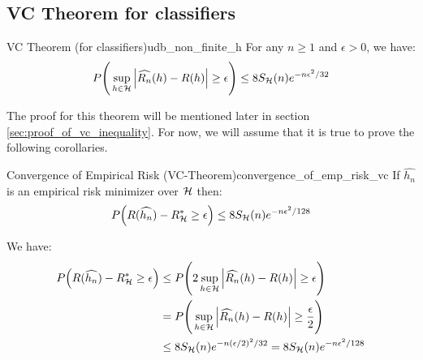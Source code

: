 \subsection{VC Theorem for classifiers}
\begin{theorem}{VC Theorem (for classifiers)}{udb_non_finite_h}
    For any $n\ge1$ and $\epsilon>0$, we have:
    \begin{align*}
        P\Bigg( 
            \sup_{h\in\mathcal{H}} \Big| 
                \widehat{R_n}(h) - R(h)
             \Big| \ge \epsilon
         \Bigg) \le 8S_{\mathcal{H}}(n) e^{-n\epsilon^2/32}
    \end{align*}
\end{theorem}

\begin{proof*}
    The proof for this theorem will be mentioned later in section \ref{sec:proof_of_vc_inequality}. For now, we will assume that it is true to prove the following corollaries.
\end{proof*}

\begin{corollary}{Convergence of Empirical Risk (VC-Theorem)}{convergence_of_emp_risk_vc}
    If $\widehat{h_n}$ is an empirical risk minimizer over $\mathcal{H}$ then:
    \begin{align*}
        P\Big( 
            R(\widehat{h_n}) - R_{\mathcal{H}}^* \ge \epsilon
         \Big) \le 8S_{\mathcal{H}}(n)e^{-n\epsilon^2/128}
    \end{align*}
\end{corollary}

\begin{proof*}
    We have:
    \begin{align*}
        P\Big( 
            R(\widehat{h_n}) - R_{\mathcal{H}}^* \ge \epsilon
         \Big) 
        &\le 
        P\Bigg( 
            2\sup_{h\in\mathcal{H}} \Big| \widehat{R_n}(h) - R(h) \Big| \ge \epsilon
         \Bigg) \\
        &= 
        P\Bigg( 
            \sup_{h\in\mathcal{H}} \Big| \widehat{R_n}(h) - R(h) \Big| \ge \frac{\epsilon}{2}
         \Bigg) \\
        &\le 8S_{\mathcal{H}}(n)e^{-n(\epsilon/2)^2/32} = 8S_{\mathcal{H}}(n)e^{-n\epsilon^2/128}
    \end{align*}
\end{proof*}


